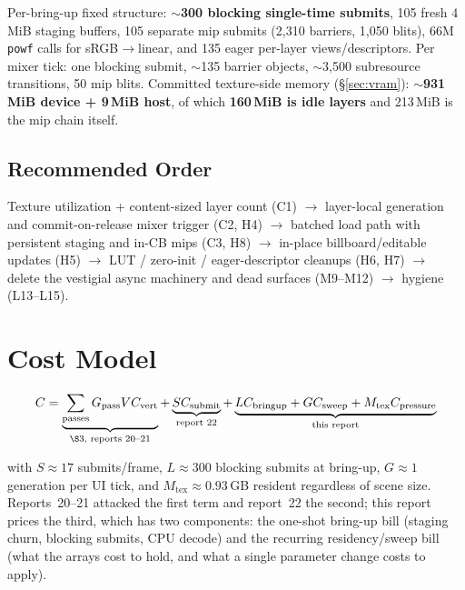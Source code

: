 \documentclass[11pt,a4paper]{article}
\begin{document}
Per-bring-up fixed structure: \textbf{$\sim$300 blocking single-time submits},
105 fresh 4\,MiB staging buffers, 105 separate mip submits (2{,}310 barriers,
1{,}050 blits), 66M \texttt{powf} calls for sRGB$\rightarrow$linear, and 135
eager per-layer views/descriptors. Per mixer tick: one blocking submit,
$\sim$135 barrier objects, $\sim$3{,}500 subresource transitions, 50 mip blits.
Committed texture-side memory (\S\ref{sec:vram}): \textbf{$\sim$931\,MiB device +
9\,MiB host}, of which \textbf{160\,MiB is idle layers} and 213\,MiB is the mip
chain itself.

\subsection{Recommended Order}

Texture utilization + content-sized layer count (C1) $\rightarrow$ layer-local
generation and commit-on-release mixer trigger (C2, H4) $\rightarrow$ batched
load path with persistent staging and in-CB mips (C3, H8) $\rightarrow$
in-place billboard/editable updates (H5) $\rightarrow$ LUT / zero-init /
eager-descriptor cleanups (H6, H7) $\rightarrow$ delete the vestigial async
machinery and dead surfaces (M9--M12) $\rightarrow$ hygiene (L13--L15).

\section{Cost Model}

\begin{equation}
C = \underbrace{\sum_{\mathrm{passes}} G_{\mathrm{pass}} V C_{\mathrm{vert}}}_{\text{\S3, reports 20--21}} + \underbrace{S C_{\mathrm{submit}}}_{\text{report 22}} + \underbrace{L C_{\mathrm{bringup}} + G C_{\mathrm{sweep}} + M_{\mathrm{tex}} C_{\mathrm{pressure}}}_{\text{this report}}
\end{equation}

with $S \approx 17$ submits/frame, $L \approx 300$ blocking submits at bring-up,
$G \approx 1$ generation per UI tick, and $M_{\mathrm{tex}} \approx 0.93$\,GB
resident regardless of scene size. Reports~20--21 attacked the first term and
report~22 the second; this report prices the third, which has two components:
the one-shot bring-up bill (staging churn, blocking submits, CPU decode) and
the recurring residency/sweep bill (what the arrays cost to hold, and what a
single parameter change costs to apply).
\end{document}
